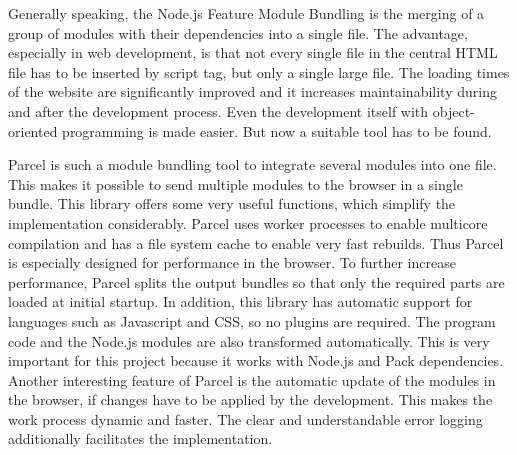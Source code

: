 Generally speaking, the Node.js Feature Module Bundling is the merging of a group of modules with their dependencies into a single file. The advantage, especially in web development, is that not every single file in the central HTML file has to be inserted by script tag, but only a single large file. The loading times of the website are significantly improved and it increases maintainability during and after the development process. Even the development itself with object-oriented programming is made easier. But now a suitable tool has to be found. \cite{Kasireddy2016}

Parcel is such a module bundling tool to integrate several modules into one file. This makes it possible to send multiple modules to the browser in a single bundle. This library offers some very useful functions, which simplify the implementation considerably. Parcel uses worker processes to enable multicore compilation and has a file system cache to enable very fast rebuilds. Thus Parcel is especially designed for performance in the browser. To further increase performance, Parcel splits the output bundles so that only the required parts are loaded at initial startup. In addition, this library has automatic support for languages such as Javascript and CSS, so no plugins are required. The program code and the Node.js modules are also transformed automatically. This is very important for this project because it works with Node.js and Pack dependencies. Another interesting feature of Parcel is the automatic update of the modules in the browser, if changes have to be applied by the development. This makes the work process dynamic and faster. The clear and understandable error logging additionally facilitates the implementation. \cite{Govett2019}

